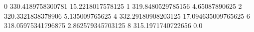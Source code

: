 0 330.4189758300781 15.2218017578125
1 319.8480529785156 4.65087890625
2 320.3321838378906 5.135009765625
4 332.29180908203125 17.094635009765625
6 318.05975341796875 2.862579345703125
8 315.1971740722656 0.0
